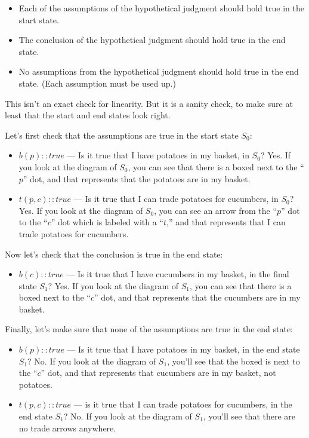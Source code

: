 \documentclass[../../../main.tex]{subfiles}
\begin{document}
\begin{itemize}
  \item{Each of the assumptions of the hypothetical judgment should hold true in the start state.}
  \item{The conclusion of the hypothetical judgment should hold true in the end state.}
  \item{No assumptions from the hypothetical judgment should hold true in the end state. (Each assumption must be used up.)}
\end{itemize}

\noindent
This isn't an exact check for linearity. But it is a sanity check, to make sure at least that the start and end states look right.

Let's first check that the assumptions are true in the start state $S_{0}$:

\begin{itemize}
  \item{$b(p) :: true$ --- Is it true that I have potatoes in my basket, in $S_{0}$? Yes. If you look at the diagram of $S_{0}$, you can see that there is a boxed  next to the ``$p$'' dot, and that represents that the potatoes are in my basket.}
  \item{$t(p, c) :: true$ --- Is it true that I can trade potatoes for cucumbers, in $S_{0}$? Yes. If you look at the diagram of $S_{0}$, you can see an arrow from the ``$p$'' dot to the ``$c$'' dot which is labeled with a ``$t$,'' and that represents that I can trade potatoes for cucumbers.}
\end{itemize}

\noindent
Now let's check that the conclusion is true in the end state:

\begin{itemize}
  \item{$b(c) :: true$ --- Is it true that I have cucumbers in my basket, in the final state $S_{1}$? Yes. If you look at the diagram of $S_{1}$, you can see that there is a boxed  next to the ``$c$'' dot, and that represents that the cucumbers are in my basket.}
\end{itemize}

\noindent
Finally, let's make sure that none of the assumptions are true in the end state:

\begin{itemize}
  \item{$b(p) :: true$ --- Is it true that I have potatoes in my basket, in the end state $S_{1}$? No. If you look at the diagram of $S_{1}$, you'll see that the boxed  is next to the ``$c$'' dot, and that represents that cucumbers are in my basket, not potatoes.}
  \item{$t(p, c) :: true$ --- is it true that I can trade potatoes for cucumbers, in the end state $S_{1}$? No. If you look at the diagram of $S_{1}$, you'll see that there are no trade arrows anywhere.}
\end{itemize}
\end{document}
